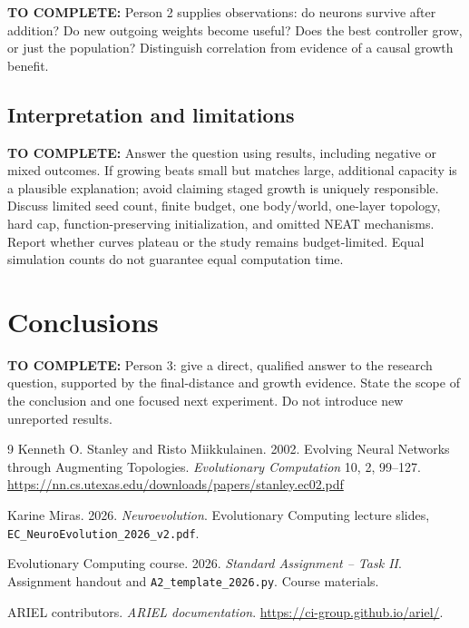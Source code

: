 \documentclass[sigconf,nonacm]{acmart}
\newcommand{\todo}[1]{\par\smallskip\noindent\textcolor{blue!60!black}{\textbf{TO COMPLETE:} #1}\par\smallskip}
\begin{document}
\todo{Person 2 supplies observations: do neurons survive after addition? Do new
outgoing weights become useful? Does the best controller grow, or just the
population? Distinguish correlation from evidence of a causal growth benefit.}

\subsection{Interpretation and limitations}
\todo{Answer the question using results, including negative or mixed outcomes.
If growing beats small but matches large, additional capacity is a plausible
explanation; avoid claiming staged growth is uniquely responsible. Discuss
limited seed count, finite budget, one body/world, one-layer topology, hard cap,
function-preserving initialization, and omitted NEAT mechanisms. Report whether
curves plateau or the study remains budget-limited. Equal simulation counts do
not guarantee equal computation time.}

\section{Conclusions}
\todo{Person 3: give a direct, qualified answer to the research question, supported
by the final-distance and growth evidence. State the scope of the conclusion and
one focused next experiment. Do not introduce new unreported results.}

\clearpage
\begin{thebibliography}{9}
Kenneth O. Stanley and Risto Miikkulainen. 2002.
Evolving Neural Networks through Augmenting Topologies.
\emph{Evolutionary Computation} 10, 2, 99--127.
\url{https://nn.cs.utexas.edu/downloads/papers/stanley.ec02.pdf}

Karine Miras. 2026. \emph{Neuroevolution}. Evolutionary Computing lecture slides,
\texttt{EC\_NeuroEvolution\_2026\_v2.pdf}.

Evolutionary Computing course. 2026.
\emph{Standard Assignment -- Task II}. Assignment handout and
\texttt{A2\_template\_2026.py}. Course materials.

ARIEL contributors. \emph{ARIEL documentation}.
\url{https://ci-group.github.io/ariel/}.
\end{thebibliography}
\end{document}
